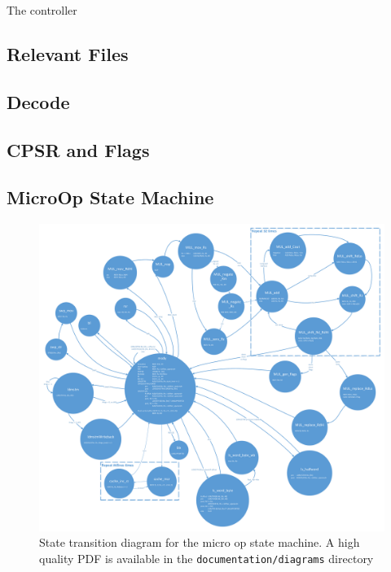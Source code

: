 \label{sec:c}
The controller

\subsection{Relevant Files}

\subsection{Decode}

\subsection{CPSR and Flags}

\subsection{MicroOp State Machine}\label{sec:uop}


\begin{figure}[h!]
\centering
\includegraphics[width=\textwidth]{./diagrams/micropfsm_drawing.pdf}
\caption{State transition diagram for the micro op state machine. A high quality PDF is available in the \texttt{documentation/diagrams} directory}
\label{fig:uopdiagram}
\end{figure}
